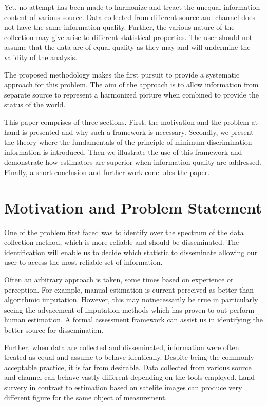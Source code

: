 \documentclass[nojss]{jss}
\begin{document}
Yet, no attempt has been made to harmonize and treaet the unequal
information content of various source. Data collected from different
source and channel does not have the same information
quality. Further, the various nature of the collection may give arise
to different statistical properties. The user should not assume that
the data are of equal quality as they may and will undermine the
validity of the analysis.


The proposed methodology makes the first pursuit to provide a
systematic approach for this problem. The aim of the approach is to
allow information from separate source to represent a harmonized
picture when combined to provide the status of the world.

This paper comprises of three sections. First, the motivation and the
problem at hand is presented and why such a framework is
necessary. Secondly, we present the theory where the fundamentals of
the principle of minimum discrimination information is
introduced. Then we illustrate the use of this framework and
demonstrate how estimators are superior when information quality are
addressed. Finally, a short conclusion and further work concludes the
paper.

\section{Motivation and Problem Statement}

One of the problem first faced was to identify over the spectrum of
the data collection method, which is more reliable and should be
disseminated. The identification will enable us to decide which
statistic to disseminate allowing our user to access the most reliable
set of information.

Often an arbitrary approach is taken, some times based on experience
or perception. For example, manual estimation is current perceived as
better than algorithmic imputation. However, this may notnecessarily
be true in particularly seeing the advacement of imputation methods
which has proven to out perform human estimation. A formal assessment
framework can assist us in identifying the better source for
dissemination.


Further, when data are collected and disseminated, information were
often treated as equal and assume to behave identically. Despite being
the commonly acceptable practice, it is far from desirable. Data
collected from various source and channel can behave vastly different
depending on the tools employed. Land survery in contrast to
estimation based on satelite images can produce very different figure
for the same object of measurement.
\end{document}
